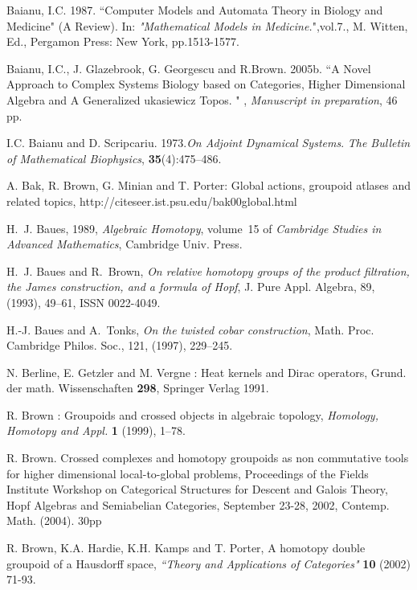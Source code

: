\documentclass[12pt]{article}
\theoremstyle{definition}
\theoremstyle{remark}
\numberwithin{equation}{subsection}
\begin{document}
\begin{thebibliography}{99}
Baianu, I.C. 1987. ``Computer Models and Automata Theory in Biology and Medicine" (A Review). 
In: \emph{"Mathematical Models in Medicine.}",vol.7., M. Witten, Ed., Pergamon Press: New 
York, pp.1513-1577.

Baianu, I.C., J. Glazebrook, G. Georgescu and R.Brown. 2005b. ``A Novel Approach to Complex
Systems Biology based on Categories, Higher Dimensional Algebra and A Generalized
\Textsl{\L}ukasiewicz Topos. " , \emph{Manuscript in preparation}, 46 pp.

I.C. Baianu and D. Scripcariu. 1973.\emph{On Adjoint Dynamical Systems}. \emph{The Bulletin of %
Mathematical Biophysics}, \textbf{35}(4):475--486.

A. Bak, R. Brown, G. Minian and T. Porter: Global actions, groupoid atlases and related 
topics, http://citeseer.ist.psu.edu/bak00global.html


H.~J. Baues, 1989, {\em Algebraic Homotopy\/}, volume~15 of {\em Cambridge  Studies in Advanced Mathematics},
 Cambridge Univ. Press.

H.~J. Baues and R.~Brown, {\em On relative homotopy groups of the
product filtration, the {J}ames construction, and a formula of {H}opf\/}, J. Pure
  Appl. Algebra, 89, (1993), 49--61, ISSN 0022-4049.

H.-J. Baues and A.~Tonks, {\em On the twisted cobar construction}, 
Math.  Proc. Cambridge Philos. Soc., 121, (1997), 229--245.

N. Berline, E. Getzler and M. Vergne : Heat kernels and Dirac
operators, Grund. der math. Wissenschaften \textbf{298}, Springer
Verlag 1991.

R. Brown : Groupoids and crossed objects in algebraic topology,
\emph{Homology, Homotopy and Appl.} \textbf{1} (1999), 1--78.

R. Brown. Crossed complexes and homotopy groupoids as non commutative tools for higher 
dimensional local-to-global problems, Proceedings of the Fields Institute Workshop on 
Categorical Structures for Descent and Galois Theory, Hopf Algebras and Semiabelian 
Categories, September 23-28, 2002, Contemp. Math. (2004). 30pp  


R. Brown, K.A. Hardie, K.H. Kamps  and T. Porter, A homotopy double groupoid of a Hausdorff 
space, {\em ``Theory and Applications of Categories"} \textbf{10} (2002) 71-93.


\end{thebibliography}
\end{document}

